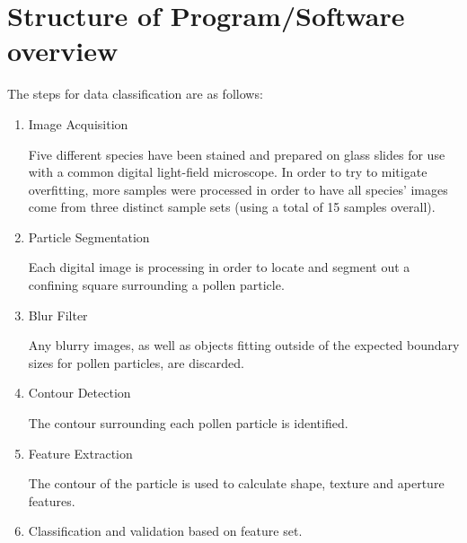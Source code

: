 \section{Structure of Program/Software overview} 

The steps for data classification are as follows:
\begin{enumerate}
\item Image Acquisition

Five different species have been stained and prepared on glass slides for use with a common digital light-field microscope.  In order to try to mitigate  overfitting, more samples were processed in order to have all species' images come from three distinct sample sets (using a total of 15 samples overall). 

\item Particle Segmentation

Each digital image is processing in order to locate and segment out a confining square surrounding a pollen particle.

\item Blur Filter

Any blurry images, as well as objects fitting outside of the expected boundary sizes for pollen particles, are discarded.

\item Contour Detection

The contour surrounding each pollen particle is identified.

\item Feature Extraction

The contour of the particle is used to calculate shape, texture and aperture features.

\item Classification and validation based on feature set.

\end{enumerate}
    
    
    
    
    
    
    
    
    
    
    
    
    
    
    
  
  
  
  
  
  
